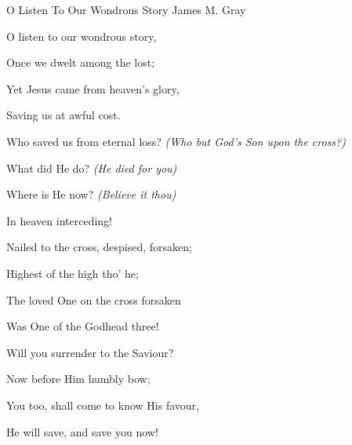 \documentclass[12pt]{book}
\begin{document}
\begin{song}{O Listen To Our Wondrous Story}{}
  {\SBPubDom}
  {James M. Gray}
  {}
  {}

  \begin{SBVerse}
    O listen to our wondrous story,

    Once we dwelt among the lost;

    Yet Jesus came from heaven's glory,

    Saving us at awful cost.
  \end{SBVerse}

  \begin{SBOpGroup}
    Who saved us from eternal loss? \textit{(Who but God's Son upon the cross?)}

    What did He do? \textit{(He died for you)}

    Where is He now? \textit{(Believe it thou)}

    In heaven interceding!
  \end{SBOpGroup}

  \begin{SBVerse}
    Nailed to the cross, despised, forsaken;

    Highest of the high tho' he;

    The loved One on the cross forsaken

    Was One of the Godhead three!
  \end{SBVerse}

  \begin{SBVerse}
    Will you surrender to the Saviour?

    Now before Him humbly bow;

    You too, shall come to know His favour,

    He will save, and save you now!
  \end{SBVerse}
\end{song}
\end{document}
